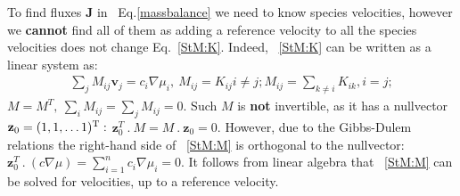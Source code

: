 \documentclass[../main.tex]{subfiles}
\begin{document}




To find fluxes $\mathbf{J}$ in ~Eq.\ref{massbalance} we need to know species velocities, however we {\bf cannot} find all of them
as adding a reference velocity to all the species velocities does not change  Eq.~\ref{StM:K}.
Indeed, ~\ref{StM:K} can be written as a linear system as:
\begin{equation} \begin{array}{l}
    \displaystyle \sum_{j }  M_{ij}  \mathbf{v}_j  = c_i \nabla \mu_i , \
    M_{ij}=  K_{ij}  i\neq j; M_{ij}= \sum_{k\neq i} K_{ik}, i = j; 
    \label{StM:M}
\end{array} \end{equation}
$
M= M^T, \  \displaystyle  \sum_{i} M_{ij} = \sum_{j } M_{ij} = 0.
$
Such $M$ is \textbf{not} invertible, as it has a nullvector $\mathbf{z}_0= (1,1, \ldots 1)^{\mbox{\scriptsize T}}: $
$
\mathbf{z}_0^{T}   \ . \  M = M \ . \ \mathbf{z}_0 = 0.
$
However, due to the Gibbs-Dulem relations \cite{GoyalMonroe} the right-hand side of ~\ref{StM:M} is orthogonal to the nullvector:
$
 \mathbf{z}_0^{T}   \ . \ \left( c  \nabla \mu \right) =   \sum_{i=1}^n c_i \nabla \mu_i = 0.
$
It follows from linear algebra that ~\ref{StM:M} can be solved for velocities, up to  a reference velocity.%
\end{document}
